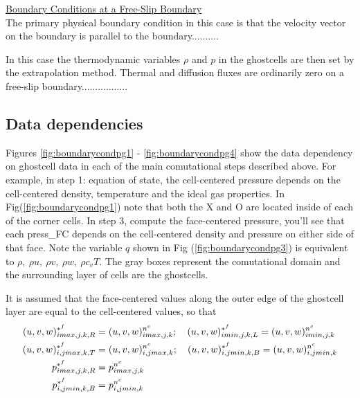 \documentclass[fleqn]{article}
\begin{document}
{\underline{Boundary Conditions at a Free-Slip Boundary}\\
The primary physical boundary condition in this case is that the velocity
vector on the boundary is parallel to the boundary..........

In this case the thermodynamic variables $\rho$ and $p$ in the ghostcells
are then set by the extrapolation method.  Thermal and diffusion fluxes are
ordinarily zero on a free-slip boundary.................

\subsection{Data dependencies}
Figures \ref{fig:boundarycondpg1} - \ref{fig:boundarycondpg4} show the data
dependency on ghostcell data in each of the main comutational steps described
above.  For example, in step 1: equation of state, the cell-centered pressure
depends on the cell-centered density, temperature and the ideal gas properties.
In Fig(\ref{fig:boundarycondpg1}) note that both the X and O are located inside
of each of the corner cells. In step 3, compute the face-centered pressure,
you'll see that each press\_FC depends on the cell-centered density and
pressure on either side of that face.  Note the variable $q$ shown in Fig
(\ref{fig:boundarycondpg3}) is equivalent to $\rho,~\rho u,~\rho v,~\rho
w,~\rho c_vT.$  The gray boxes represent the comutational domain and the
surrounding layer of cells are the ghostcells.


It is assumed that the face-centered values along the outer edge of the
ghostcell layer are equal to the cell-centered values, so that
\begin{align}
    (u,v,w)^{*^{f}}_{{imax,j,k,R}} &= (u,v,w)^{n^{c}}_{imax,j,k};   \quad  
    (u,v,w)^{*^{f}}_{{imin,j,k,L}} = (u,v,w)^{n^{c}}_{imin,j,k}     \notag \\
    (u,v,w)^{*^{f}}_{{i,jmax,k,T}} &= (u,v,w)^{n^{c}}_{i,jmax,k};   \quad  
    (u,v,w)^{*^{f}}_{{i,jmin,k,B}} = (u,v,w)^{n^{c}}_{i,jmin,k}     \notag \\
    p^{*^{f}}_{{imax,j,k,R}} &= p^{n^{c}}_{imax,j,k}                \notag \\     
    p^{*^{f}}_{{i,jmin,k,B}} &= p^{n^{c}}_{i,jmin,k}                \notag 
\end{align}


}
\end{document}
